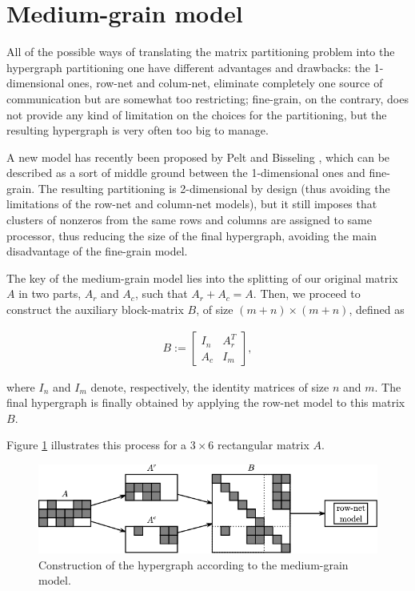 \section{Medium-grain model} \label{sec:mediumgrain}

All of the possible ways of translating the matrix partitioning problem into the hypergraph partitioning one have different advantages and drawbacks: the 1-dimensional ones, row-net and colum-net, eliminate completely one source of communication but are somewhat too restricting; fine-grain, on the contrary, does not provide any kind of limitation on the choices for the partitioning, but the resulting hypergraph is very often too big to manage.

A new model has recently been proposed by Pelt and Bisseling \cite{mediumgrain}, which can be described as a sort of middle ground between the 1-dimensional ones and fine-grain. The resulting partitioning is 2-dimensional by design (thus avoiding the limitations of the row-net and column-net models), but it still imposes that clusters of nonzeros from the same rows and columns are assigned to same processor, thus reducing the size of the final hypergraph, avoiding the main disadvantage of the fine-grain model.

The key of the medium-grain model lies into the splitting of our original matrix $A$ in two parts, $A_r$ and $A_c$, such that $A_r + A_c = A$. Then, we proceed to construct the auxiliary block-matrix $B$, of size $(m+n) \times (m+n)$, defined as

\begin{align}
	B:=	\begin{bmatrix}
		I_n & A_r^T \\
		A_c & I_m
	\end{bmatrix},
	\label{eq:Bmatrix}
\end{align}

where $I_n$ and $I_m$ denote, respectively, the identity matrices of size $n$ and $m$. The final hypergraph is finally obtained by applying the row-net model to this matrix $B$. 

Figure \ref{fig:mediumgrain-1} illustrates this process for a $3 \times 6$ rectangular matrix $A$.

\begin{figure}[h]
	\centering
	\includegraphics{img/mg-1}
	\caption{Construction of the hypergraph according to the medium-grain model.}
	\label{fig:mediumgrain-1}
\end{figure}

